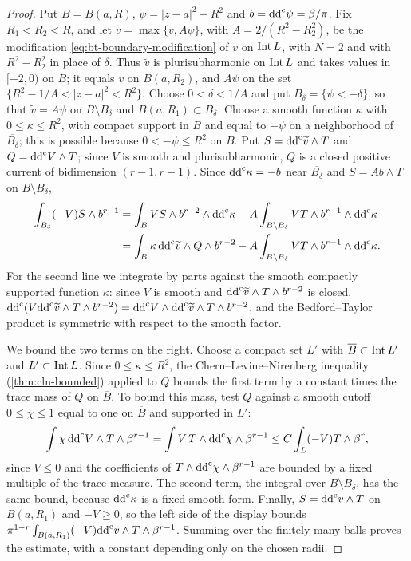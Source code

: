 \begin{proof}
Put $B=B(a,R)$, $\psi=|z-a|^2-R^2$ and $b=\mathrm{dd}^{\mathrm{c}}\psi=\beta/\pi$. Fix $R_1<R_2<R$, and let $\widetilde v=\max\{v,A\psi\}$, with $A=2/(R^2-R_2^2)$, be the modification \eqref{eq:bt-boundary-modification} of $v$ on $\operatorname{Int} L$, with $N=2$ and with $R^2-R_2^2$ in place of $\delta$. Thus $\widetilde v$ is plurisubharmonic on $\operatorname{Int} L$ and takes values in $[-2,0)$ on $B$; it equals $v$ on $B(a,R_2)$, and $A\psi$ on the set $\{R^2-1/A<|z-a|^2<R^2\}$. Choose $0<\delta<1/A$ and put $B_\delta=\{\psi<-\delta\}$, so that $\widetilde v=A\psi$ on $B\setminus B_\delta$ and $B(a,R_1)\subset B_\delta$. Choose a smooth function $\kappa$ with $0\leq\kappa\leq R^2$, with compact support in $B$ and equal to $-\psi$ on a neighborhood of $\overline{B_\delta}$; this is possible because $0<-\psi\leq R^2$ on $B$. Put $S=\mathrm{dd}^{\mathrm{c}}\widetilde v\wedge T$ and $Q=\mathrm{dd}^{\mathrm{c}} V\wedge T$; since $V$ is smooth and plurisubharmonic, $Q$ is a closed positive current of bidimension $(r-1,r-1)$. Since $\mathrm{dd}^{\mathrm{c}}\kappa=-b$ near $\overline{B_\delta}$ and $S=Ab\wedge T$ on $B\setminus B_\delta$,
\[
 \begin{aligned}
 \int_{B_\delta}(-V)S\wedge b^{r-1}
 &=\int_B VS\wedge b^{r-2}\wedge\mathrm{dd}^{\mathrm{c}}\kappa
       -A\int_{B\setminus B_\delta}
                          VT\wedge b^{r-1}\wedge\mathrm{dd}^{\mathrm{c}}\kappa\\
 &=\int_B\kappa\,\mathrm{dd}^{\mathrm{c}}\widetilde v\wedge Q\wedge b^{r-2}
       -A\int_{B\setminus B_\delta}
                          VT\wedge b^{r-1}\wedge\mathrm{dd}^{\mathrm{c}}\kappa.
 \end{aligned}
\]
For the second line we integrate by parts against the smooth compactly supported function $\kappa$: since $V$ is smooth and $\mathrm{dd}^{\mathrm{c}}\widetilde v\wedge T\wedge b^{r-2}$ is closed, $\mathrm{dd}^{\mathrm{c}}(V\mathrm{dd}^{\mathrm{c}}\widetilde v\wedge T\wedge b^{r-2})=\mathrm{dd}^{\mathrm{c}} V\wedge\mathrm{dd}^{\mathrm{c}}\widetilde v\wedge T\wedge b^{r-2}$, and the Bedford--Taylor product is symmetric with respect to the smooth factor.

We bound the two terms on the right. Choose a compact set $L'$ with $\overline B\subset\operatorname{Int} L'$ and $L'\subset\operatorname{Int} L$. Since $0\leq\kappa\leq R^2$, the Chern--Levine--Nirenberg inequality (\cref{thm:cln-bounded}) applied to $Q$ bounds the first term by a constant times the trace mass of $Q$ on $\overline B$. To bound this mass, test $Q$ against a smooth cutoff $0\leq\chi\leq1$ equal to one on $\overline B$ and supported in $L'$:
\[
 \int\chi\,\mathrm{dd}^{\mathrm{c}} V\wedge T\wedge\beta^{r-1}=\int V\,T\wedge\mathrm{dd}^{\mathrm{c}}\chi\wedge\beta^{r-1}\leq C\int_L(-V)T\wedge\beta^r,
\]
since $V\leq0$ and the coefficients of $T\wedge\mathrm{dd}^{\mathrm{c}}\chi\wedge\beta^{r-1}$ are bounded by a fixed multiple of the trace measure. The second term, the integral over $B\setminus B_\delta$, has the same bound, because $\mathrm{dd}^{\mathrm{c}}\kappa$ is a fixed smooth form. Finally, $S=\mathrm{dd}^{\mathrm{c}} v\wedge T$ on $B(a,R_1)$ and $-V\geq0$, so the left side of the display bounds $\pi^{1-r}\int_{B(a,R_1)}(-V)\mathrm{dd}^{\mathrm{c}} v\wedge T\wedge\beta^{r-1}$. Summing over the finitely many balls proves the estimate, with a constant depending only on the chosen radii.


\end{proof}
